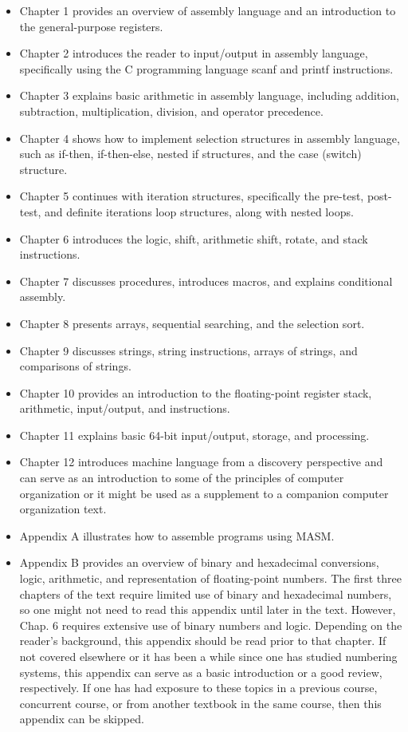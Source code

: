 \documentclass[10pt]{article}
\begin{document}
\begin{itemize}
  \item Chapter 1 provides an overview of assembly language and an introduction to the general-purpose registers.
  \item Chapter 2 introduces the reader to input/output in assembly language, specifically using the C programming language scanf and printf instructions.
  \item Chapter 3 explains basic arithmetic in assembly language, including addition, subtraction, multiplication, division, and operator precedence.
  \item Chapter 4 shows how to implement selection structures in assembly language, such as if-then, if-then-else, nested if structures, and the case (switch) structure.
  \item Chapter 5 continues with iteration structures, specifically the pre-test, post-test, and definite iterations loop structures, along with nested loops.
  \item Chapter 6 introduces the logic, shift, arithmetic shift, rotate, and stack instructions.
  \item Chapter 7 discusses procedures, introduces macros, and explains conditional assembly.
  \item Chapter 8 presents arrays, sequential searching, and the selection sort.
  \item Chapter 9 discusses strings, string instructions, arrays of strings, and comparisons of strings.
  \item Chapter 10 provides an introduction to the floating-point register stack, arithmetic, input/output, and instructions.
  \item Chapter 11 explains basic 64-bit input/output, storage, and processing.
  \item Chapter 12 introduces machine language from a discovery perspective and can serve as an introduction to some of the principles of computer organization or it might be used as a supplement to a companion computer organization text.
  \item Appendix A illustrates how to assemble programs using MASM.
  \item Appendix B provides an overview of binary and hexadecimal conversions, logic, arithmetic, and representation of floating-point numbers. The first three chapters of the text require limited use of binary and hexadecimal numbers, so one might not need to read this appendix until later in the text. However, Chap. 6 requires extensive use of binary numbers and logic. Depending on the reader's background, this appendix should be read prior to that chapter. If not covered elsewhere or it has been a while since one has studied numbering systems, this appendix can serve as a basic introduction or a good review, respectively. If one has had exposure to these topics in a previous course, concurrent course, or from another textbook in the same course, then this appendix can be skipped.

\end{itemize}
\end{document}
